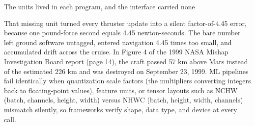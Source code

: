 \documentclass[aspectratio=169, 12pt]{beamer}
\begin{document}
\begin{frame}{The units lived in each program, and the interface carried none}
{    That missing unit turned every thruster update into a silent factor-of-4.45 error, because one pound-force second equals 4.45 newton-seconds. The bare number left ground software untagged, entered navigation 4.45 times too small, and accumulated drift across the cruise. In Figure 4 of the 1999 NASA Mishap Investigation Board report (page 14), the craft passed 57 km above Mars instead of the estimated 226 km and was destroyed on September 23, 1999. ML pipelines fail identically when quantization scale factors (the multipliers converting integers back to floating-point values), feature units, or tensor layouts such as NCHW (batch, channels, height, width) versus NHWC (batch, height, width, channels) mismatch silently, so frameworks verify shape, data type, and device at every call.



  }
\end{frame}
\end{document}
